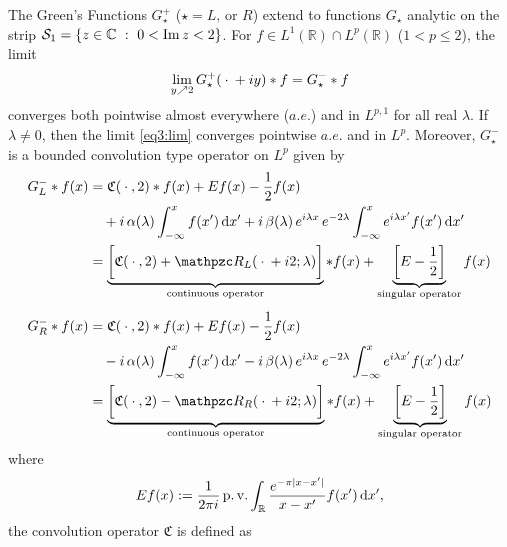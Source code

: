 \documentclass[../dissertation.tex]{subfiles}
\begin{document}
\begin{thm}\label{thm3:main_result}
	The Green's Functions $G_\star^+$ ($\star = L \text{, or }R$) extend to 
	functions $G_\star$ analytic 
	on the strip $\mathcal S_1 = \{z \in \mathbb C ~:~ 0 < \operatorname{Im} z < 2 \}$.
	For 
	$f \in L^1(\mathbb R) \cap L^p(\mathbb R)$ ($1< p \leq 2$), the limit
	\begin{align}\label{eq3:lim}
		\lim_{y\nearrow 2} G_\star^+(\kern 0.5ex \cdot \kern 0.5ex+iy)*f = G_\star^- * f
	\end{align}
	converges both pointwise almost everywhere ($a.e.$\label{sym:ae}) and in 
	$L^{p,1}$ 
	for all real $\lambda$. If $\lambda \ne 0$, then the limit 
	\eqref{eq3:lim} converges pointwise $a.e.$ and in $L^p$. 
	Moreover, $G_\star^-$ is a bounded
	convolution type operator on $L^p$ given by 
	\begin{subequations} \label{eq3:GstarMinus}
		\begin{align} 
		\label{eq3:GLminus}
		G_L^- * f(x)
			&= \mathfrak C(\dotarg, 2) * f(x) + Ef(x) - \frac{1}{2} f(x) \\
			&\quad + i \, \alpha(\lambda) \int_{-\infty}^x f(x')\, \mathrm{d}x' 
				+ i\, \beta(\lambda) \,e^{i\lambda x} \, e^{-2\lambda} 
					\int_{-\infty}^x e^{i\lambda x'} f(x')\, \mathrm{d}x' 
				\nonumber \\
			&= 
				\underbrace{
					\bigg[\mathfrak C(\dotarg, 2) + \mathpzc R_L(\dotarg+i2; \lambda)\bigg]
				}_{\text{continuous operator}}
				* f(x)
				+ 
				\underbrace{
					\left[E - \frac{1}{2}\right]
				}_{\text{singular operator}}f(x)
				\nonumber \\[0.3\baselineskip]
		\label{eq3:GRminus}
		G_R^- * f(x)
			&= \mathfrak C(\dotarg, 2) * f(x) + Ef(x) - \frac{1}{2} f(x) \\
			&\quad - i \, \alpha(\lambda) \int_{-\infty}^x f(x')\, \mathrm{d}x' 
				- i\, \beta(\lambda) \,e^{i\lambda x} \, e^{-2\lambda} 
					\int_{-\infty}^x e^{i\lambda x'} f(x')\, \mathrm{d}x' 
				\nonumber \\
			&= 
				\underbrace{
					\bigg[\mathfrak C(\dotarg, 2) - \mathpzc R_R( \dotarg+i2; \lambda)\bigg]
				}_{\text{continuous operator}}
				* f(x) 
				+
				\underbrace{
					\left[E - \frac{1}{2}\right]
				}_{\text{singular operator}}f(x)
				\nonumber 
		\end{align}
	\end{subequations}
	where
	\[
		Ef(x) 
			:= \frac{1}{2\pi i} \operatorname{p.v.} \int_{\mathbb R} 
					\frac{e^{-\pi|x-x'|}}{x-x'} f(x') 
				\, \mathrm{d}x', \label{sym:ExpHil}
	\]
	the convolution operator $\mathfrak C$\label{sym:mathfrakC} is defined as

\end{thm}
\end{document}
